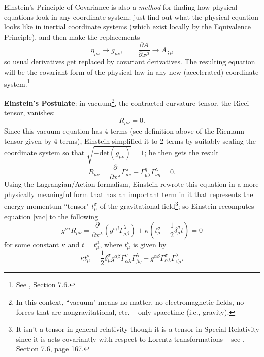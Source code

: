 \documentclass[12pt,reqno]{amsart}
\theoremstyle{definition}
\numberwithin{equation}{section}
\begin{document}
Einstein's Principle of Covariance is also a {\it method} for finding how physical equations look in any coordinate system: just find out what the physical equation looks like in inertial coordinate systems (which exist locally by the Equivalence Principle), and then make the replacements
\[ 
\eta_{\mu\nu} \longrightarrow g_{\mu\nu}, \qquad \frac{\partial A}{\partial x^\mu} \longrightarrow A_{\ ;\mu} 
\] 
so usual derivatives get replaced by covariant derivatives. The resulting equation will be the covariant form of the physical law in any new (accelerated) coordinate system.\footnote{See \cite{Weinberg2}, Section 7.6.}

\medskip

{\bf Einstein's Postulate}: in vacuum\footnote{In this context, ``vacuum" means no matter, no electromagnetic fields, no forces that are nongravitational, etc. -- only spacetime (i.e., gravity).}, the contracted curvature tensor, the Ricci tensor, vanishes:
\[
R_{\mu\nu} = 0.
\]
Since this vacuum equation has 4 terms (see definition above of the Riemann tensor given by 4 terms), Einstein simplified it to 2 terms by suitably scaling the coordinate system so that $\sqrt{-\text{det}(g_{\mu\nu})} = 1$; he then gets the result
\begin{equation}\label{vac}
R_{\mu\nu} = \frac{\partial}{\partial x^\lambda} \Gamma^{\lambda}_{\mu\nu}
+ \Gamma^{\eta}_{\mu\lambda} \Gamma^{\lambda}_{\nu\eta} = 0.
\end{equation}
Using the Lagrangian/Action formalism, Einstein rewrote this equation in a more physically meaningful form that has an important term in it that represents the energy-momentum ``tensor" $t_\mu^\sigma$ of the gravitational field\footnote{It isn't a tensor in general relativity though it is a tensor in Special Relativity since it is acts covariantly with respect to Lorentz transformations -- see \cite{Weinberg2}, Section 7.6, page 167.}; so Einstein recomputes equation \eqref{vac} to the following 
\begin{equation}\label{vac2}
g^{\nu\sigma} R_{\mu\nu} = \frac{\partial}{\partial x^\lambda}\left(g^{\sigma\beta} \Gamma_{\mu\beta}^\lambda\right) + \kappa\left( t_\mu^\sigma - \frac12 \delta_\mu^\sigma t\right) = 0
\end{equation}
for some constant $\kappa$ and $t =  t_\mu^\mu$, where  $t_\mu^\sigma$ is given by
\[
\kappa t_\mu^\sigma = 
\frac12 \delta_\mu^\sigma g^{\alpha\beta}
\Gamma^{\eta}_{\alpha\lambda} \Gamma^{\lambda}_{\beta\eta} 
- g^{\alpha\beta}\Gamma^{\sigma}_{\alpha\lambda} \Gamma^{\lambda}_{\beta\mu}.
\]
\end{document}
